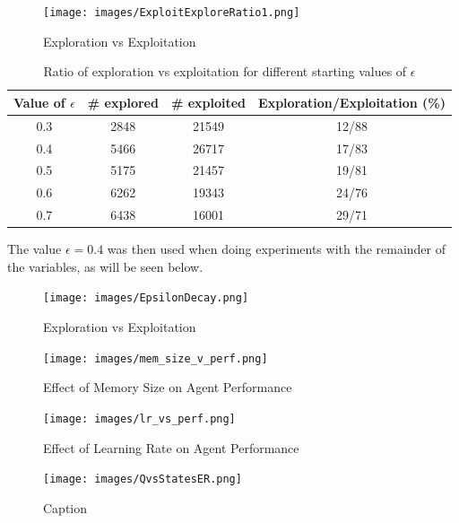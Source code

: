 \documentclass{article}
\begin{document}
\begin{figure}[H]
    \centering
    \texttt{[image: images/ExploitExploreRatio1.png]}
    \caption{Exploration vs Exploitation}
    \label{fig:Explore_Exploit}
\end{figure}

\begin{table}[H]
    \centering
    \begin{tabular}{|c||c|c|c|}
    \hline
    Value of $\epsilon$ & \# explored & \# exploited & Exploration/Exploitation (\%)\\
    \hline
    0.3 & 2848 & 21549 & 12/88 \\
    0.4 & 5466 & 26717 & 17/83 \\
    0.5 & 5175 & 21457 & 19/81 \\ 
    0.6 & 6262 & 19343 & 24/76 \\
    0.7 & 6438 & 16001 & 29/71 \\
    \hline
    \end{tabular}
    \caption{Ratio of exploration vs exploitation for different starting values of $\epsilon$}
    \label{tab:expexpratio}
\end{table}

The value $\epsilon = 0.4$ was then used when doing experiments with the remainder of the variables, as will be seen below.



\begin{figure}[H]
    \centering
    \texttt{[image: images/EpsilonDecay.png]}
    \caption{Exploration vs Exploitation}
    \label{fig:EpsilonDecay}
\end{figure}

\begin{figure}[H]
    \centering
    \texttt{[image: images/mem\_size\_v\_perf.png]}
    \caption{Effect of Memory Size on Agent Performance}
    \label{fig:mem_size_vs_perf}
\end{figure}

\begin{figure}[H]
    \centering
    \texttt{[image: images/lr\_vs\_perf.png]}
    \caption{Effect of Learning Rate on Agent Performance}
    \label{fig:lr_vs_perf
    }
\end{figure}


\begin{figure}[H]
    \hspace*{-3cm}
    \texttt{[image: images/QvsStatesER.png]}
    \caption{Caption}
    \label{fig:my_label}
\end{figure}
\end{document}
